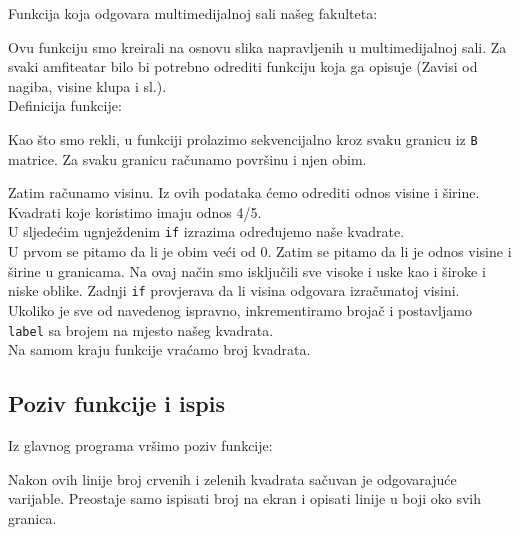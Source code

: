 \documentclass[a4paper,12pt]{article}
\begin{document}
Funkcija koja odgovara multimedijalnoj sali našeg fakulteta:


Ovu funkciju smo kreirali na osnovu slika napravljenih u multimedijalnoj sali. Za svaki amfiteatar bilo bi potrebno odrediti funkciju koja ga opisuje (Zavisi od nagiba, visine klupa i sl.).
\\
Definicija funkcije:


Kao što smo rekli, u funkciji prolazimo sekvencijalno kroz svaku granicu iz \texttt{B} matrice. Za svaku granicu računamo površinu i njen obim.



Zatim računamo visinu. Iz ovih podataka ćemo odrediti odnos visine i širine. Kvadrati koje koristimo imaju odnos 4/5.\\	
\newpage
U sljedećim ugnježdenim \texttt{if} izrazima određujemo naše kvadrate.\\


U prvom se pitamo da li je obim veći od  0.
Zatim se pitamo da li je odnos visine i širine u granicama. Na ovaj način smo isključili sve visoke i uske kao i široke i niske oblike.
Zadnji \texttt{if} provjerava da li visina odgovara izračunatoj visini.\\

Ukoliko je sve od navedenog ispravno, inkrementiramo brojač i postavljamo \texttt{label} sa brojem na mjesto našeg kvadrata.
\\

Na samom kraju funkcije vraćamo broj kvadrata.



\subsection{Poziv funkcije i ispis}

Iz glavnog programa vršimo poziv funkcije:


Nakon ovih linije broj crvenih i zelenih kvadrata sačuvan je odgovarajuće varijable.
Preostaje samo ispisati broj na ekran i opisati linije u boji oko svih granica.\\
\end{document}
